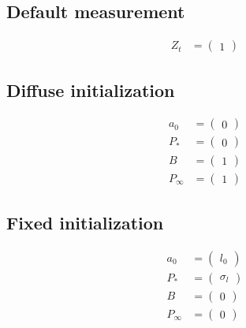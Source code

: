 \documentclass[
  letterpaper,
  DIV=11,
  numbers=noendperiod]{scrreprt}
\begin{document}
\subsection{Default measurement}\label{default-measurement-4}

\[
\begin{align*}
Z_t &= \begin{pmatrix} 1 \end{pmatrix} \end{align*} 
\]

\subsection{Diffuse initialization}\label{diffuse-initialization}

\[
\begin{align*}
a_0 &= \begin{pmatrix} 0 \end{pmatrix} \\
P_* &= \begin{pmatrix} 0 \end{pmatrix}\\
B &= \begin{pmatrix} 1 \end{pmatrix} \\
P_\infty &= \begin{pmatrix} 1 \end{pmatrix}
\end{align*}
\]

\subsection{Fixed initialization}\label{fixed-initialization}

\[
\begin{align*}
a_0 &= \begin{pmatrix} l_0 \end{pmatrix} \\
P_* &= \begin{pmatrix} \sigma_{l} \end{pmatrix}\\
B &= \begin{pmatrix} 0 \end{pmatrix} \\
P_\infty &= \begin{pmatrix} 0 \end{pmatrix}
\end{align*}
\]
\end{document}
